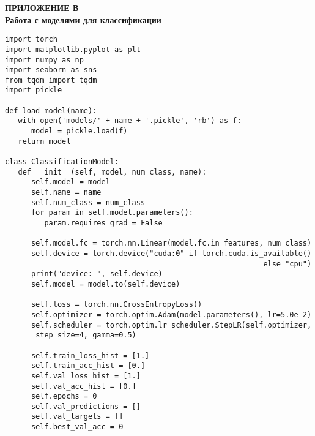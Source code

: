 \newpage\normalsize
\begin{center}
	\textbf{ПРИЛОЖЕНИЕ В\\ Работа с моделями для классификации}
\end{center}
\small
\begin{verbatim}
import torch
import matplotlib.pyplot as plt
import numpy as np
import seaborn as sns
from tqdm import tqdm
import pickle

def load_model(name):
   with open('models/' + name + '.pickle', 'rb') as f:
      model = pickle.load(f)
   return model

class ClassificationModel:
   def __init__(self, model, num_class, name):
      self.model = model
      self.name = name
      self.num_class = num_class
      for param in self.model.parameters():
         param.requires_grad = False

      self.model.fc = torch.nn.Linear(model.fc.in_features, num_class)
      self.device = torch.device("cuda:0" if torch.cuda.is_available()
                                                           else "cpu")
      print("device: ", self.device)
      self.model = model.to(self.device)
      
      self.loss = torch.nn.CrossEntropyLoss()
      self.optimizer = torch.optim.Adam(model.parameters(), lr=5.0e-2)      
      self.scheduler = torch.optim.lr_scheduler.StepLR(self.optimizer,
       step_size=4, gamma=0.5)
      
      self.train_loss_hist = [1.]
      self.train_acc_hist = [0.]
      self.val_loss_hist = [1.]
      self.val_acc_hist = [0.]
      self.epochs = 0
      self.val_predictions = []
      self.val_targets = []
      self.best_val_acc = 0


\end{verbatim}
